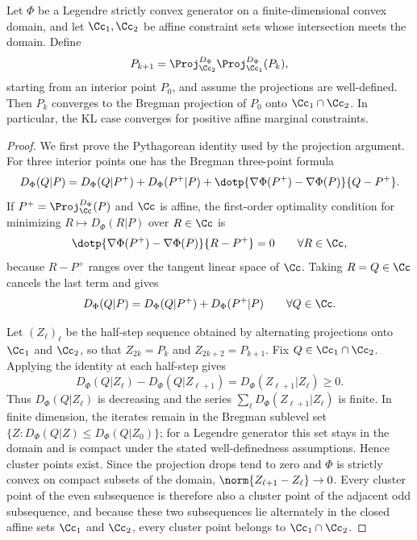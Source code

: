 \begin{prop}\label{prop-cyclic-kl-affine}
	Let $\Phi$ be a Legendre strictly convex generator on a finite-dimensional convex domain, and let $\Cc_1,\Cc_2$ be affine constraint sets whose intersection meets the domain. Define
	\[
		P_{k+1}
		=
		\Proj_{\Cc_2}^{D_\Phi}
		\Proj_{\Cc_1}^{D_\Phi}(P_k),
	\]
	starting from an interior point $P_0$, and assume the projections are well-defined. Then $P_k$ converges to the Bregman projection of $P_0$ onto $\Cc_1\cap\Cc_2$. In particular, the KL case converges for positive affine marginal constraints.
\end{prop}
\begin{proof}
	We first prove the Pythagorean identity used by the projection argument. For three interior points one has the Bregman three-point formula
	\[
		D_\Phi(Q|P)
		=
		D_\Phi(Q|P^+)
		+
		D_\Phi(P^+|P)
		+
		\dotp{\nabla\Phi(P^+)-\nabla\Phi(P)}{Q-P^+}.
	\]
	If $P^+=\Proj_\Cc^{D_\Phi}(P)$ and $\Cc$ is affine, the first-order optimality condition for minimizing $R\mapsto D_\Phi(R|P)$ over $R\in\Cc$ is
	\[
		\dotp{\nabla\Phi(P^+)-\nabla\Phi(P)}{R-P^+}=0
		\qquad \forall R\in\Cc,
	\]
	because $R-P^+$ ranges over the tangent linear space of $\Cc$. Taking $R=Q\in\Cc$ cancels the last term and gives
	\[
		D_\Phi(Q|P)=D_\Phi(Q|P^+)+D_\Phi(P^+|P)
		\qquad\forall Q\in\Cc.
	\]

	Let $(Z_\ell)_\ell$ be the half-step sequence obtained by alternating projections onto $\Cc_1$ and $\Cc_2$, so that $Z_{2k}=P_k$ and $Z_{2k+2}=P_{k+1}$. Fix $Q\in\Cc_1\cap\Cc_2$. Applying the identity at each half-step gives
	\[
		D_\Phi(Q|Z_\ell)-D_\Phi(Q|Z_{\ell+1})
		=
		D_\Phi(Z_{\ell+1}|Z_\ell)\geq0.
	\]
	Thus $D_\Phi(Q|Z_\ell)$ is decreasing and the series $\sum_\ell D_\Phi(Z_{\ell+1}|Z_\ell)$ is finite. In finite dimension, the iterates remain in the Bregman sublevel set $\{Z:D_\Phi(Q|Z)\leq D_\Phi(Q|Z_0)\}$; for a Legendre generator this set stays in the domain and is compact under the stated well-definedness assumptions. Hence cluster points exist. Since the projection drops tend to zero and $\Phi$ is strictly convex on compact subsets of the domain, $\norm{Z_{\ell+1}-Z_\ell}\to0$. Every cluster point of the even subsequence is therefore also a cluster point of the adjacent odd subsequence, and because these two subsequences lie alternately in the closed affine sets $\Cc_1$ and $\Cc_2$, every cluster point belongs to $\Cc_1\cap\Cc_2$.


\end{proof}
